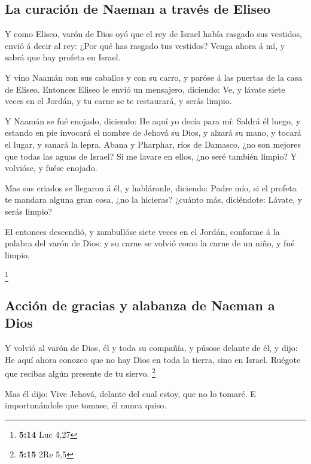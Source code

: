 \hypertarget{la-curaciuxf3n-de-naeman-a-travuxe9s-de-eliseo}{%
\subsection{La curación de Naeman a través de
Eliseo}\label{la-curaciuxf3n-de-naeman-a-travuxe9s-de-eliseo}}

 Y como Eliseo, varón de Dios oyó que el rey de Israel
había rasgado sus vestidos, envió á decir al rey: ¿Por qué has rasgado
tus vestidos? Venga ahora á mí, y sabrá que hay profeta en Israel.

 Y vino Naamán con sus caballos y con su carro, y paróse á
las puertas de la casa de Eliseo.  Entonces Eliseo le
envió un mensajero, diciendo: Ve, y lávate siete veces en el Jordán, y
tu carne se te restaurará, y serás limpio.

 Y Naamán se fué enojado, diciendo: He aquí yo decía para
mí: Saldrá él luego, y estando en pie invocará el nombre de Jehová su
Dios, y alzará su mano, y tocará el lugar, y sanará la lepra.
 Abana y Pharphar, ríos de Damasco, ¿no son mejores que
todas las aguas de Israel? Si me lavare en ellos, ¿no seré también
limpio? Y volvióse, y fuése enojado.

 Mas sus criados se llegaron á él, y habláronle,
diciendo: Padre mío, si el profeta te mandara alguna gran cosa, ¿no la
hicieras? ¿cuánto más, diciéndote: Lávate, y serás limpio?

 El entonces descendió, y zambullóse siete veces en el
Jordán, conforme á la palabra del varón de Dios: y su carne se volvió
como la carne de un niño, y fué limpio.

\footnote{\textbf{5:14} Luc 4,27}

\hypertarget{acciuxf3n-de-gracias-y-alabanza-de-naeman-a-dios}{%
\subsection{Acción de gracias y alabanza de Naeman a
Dios}\label{acciuxf3n-de-gracias-y-alabanza-de-naeman-a-dios}}

 Y volvió al varón de Dios, él y toda su compañía, y
púsose delante de él, y dijo: He aquí ahora conozco que no hay Dios en
toda la tierra, sino en Israel. Ruégote que recibas algún presente de tu
siervo. \footnote{\textbf{5:15} 2Re 5,5}

 Mas él dijo: Vive Jehová, delante del cual estoy, que no
lo tomaré. E importunándole que tomase, él nunca quiso.

